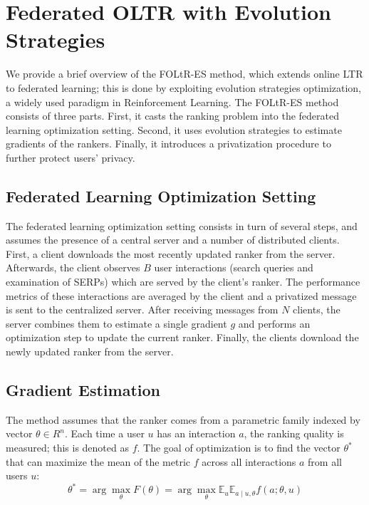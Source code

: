
\section{Federated OLTR with Evolution Strategies}\label{sec:method}

We provide a brief overview of the FOLtR-ES method, which extends online LTR to federated learning; this is done by exploiting evolution strategies optimization, a widely used paradigm in Reinforcement Learning. 
The FOLtR-ES method consists of three parts. First, it casts the ranking problem into the federated learning optimization setting. Second, it uses evolution strategies to estimate gradients of the rankers. Finally, it introduces a privatization procedure to further protect users' privacy.

\subsection{Federated Learning Optimization Setting}
The federated learning optimization setting consists in turn of several steps, and assumes the presence of a central server and a number of distributed clients. First, a client downloads the most recently updated ranker from the server. Afterwards, the client observes $B$ user interactions (search queries and examination of SERPs) which are served by the client's ranker. The performance metrics of these interactions are averaged by the client and a privatized message is sent to the centralized server. After receiving messages from $N$ clients, the server combines them to estimate a single gradient $g$ and performs an optimization step to update the current ranker. Finally, the clients download the newly updated ranker from the server.

\subsection{Gradient Estimation} \label{sec-gradient-est}
The method assumes that the ranker comes from a parametric family indexed by vector $\theta \in R^{n}$. Each time a user $u$ has an interaction $a$, the ranking quality is measured; this is denoted as $f$. The goal of optimization is to find the vector $\theta^*$ that can maximize the mean of the metric $f$ across all interactions $a$ from all users $u$:
\begin{equation}
	\theta^{*}=\arg \max _{\theta} F(\theta)=\arg \max _{\theta} \mathbb{E}_{u} \mathbb{E}_{a \mid u, \theta} f(a ; \theta, u) \label{eq-theta}
\end{equation}

